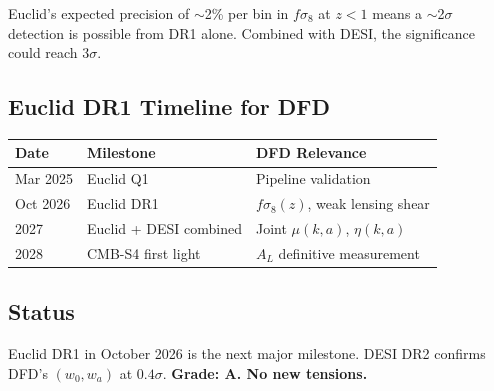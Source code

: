 \documentclass[11pt,a4paper]{article}
\begin{document}
Euclid's expected precision of $\sim$2\% per bin in $f\sigma_8$ at $z < 1$ means a $\sim$2$\sigma$ detection is possible from DR1 alone. Combined with DESI, the significance could reach $3\sigma$.

\subsection{Euclid DR1 Timeline for DFD}

\begin{center}
\begin{tabular}{lll}
\toprule
\textbf{Date} & \textbf{Milestone} & \textbf{DFD Relevance} \\
\midrule
Mar 2025 & Euclid Q1 & Pipeline validation \\
Oct 2026 & Euclid DR1 & $f\sigma_8(z)$, weak lensing shear \\
2027 & Euclid + DESI combined & Joint $\mu(k,a)$, $\eta(k,a)$ \\
2028 & CMB-S4 first light & $A_L$ definitive measurement \\
\bottomrule
\end{tabular}
\end{center}

\subsection{Status}
Euclid DR1 in October 2026 is the next major milestone. DESI DR2 confirms DFD's $(w_0, w_a)$ at $0.4\sigma$. \textbf{Grade: A. No new tensions.}
\end{document}
